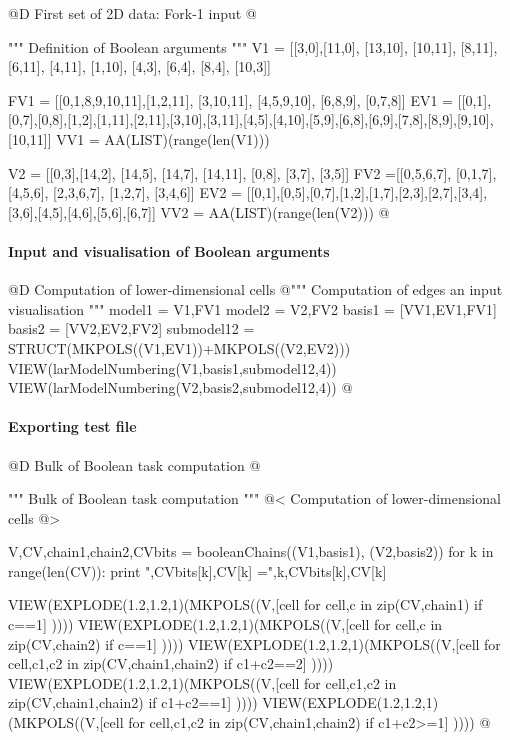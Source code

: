 \documentclass[11pt,oneside]{article}	%
\begin{document}
@D First set of 2D data: Fork-1 input
@{""" Definition of Boolean arguments """
V1 = [[3,0],[11,0], [13,10], [10,11], [8,11], [6,11], [4,11], [1,10], [4,3], [6,4], 
	[8,4], [10,3]]
	
FV1 = [[0,1,8,9,10,11],[1,2,11], [3,10,11], [4,5,9,10], [6,8,9], [0,7,8]]
EV1 = [[0,1],[0,7],[0,8],[1,2],[1,11],[2,11],[3,10],[3,11],[4,5],[4,10],[5,9],[6,8],[6,9],[7,8],[8,9],[9,10],[10,11]]
VV1 = AA(LIST)(range(len(V1)))

V2 = [[0,3],[14,2], [14,5], [14,7], [14,11], [0,8], [3,7], [3,5]]
FV2 =[[0,5,6,7], [0,1,7], [4,5,6], [2,3,6,7], [1,2,7], [3,4,6]]
EV2 = [[0,1],[0,5],[0,7],[1,2],[1,7],[2,3],[2,7],[3,4],[3,6],[4,5],[4,6],[5,6],[6,7]]
VV2 = AA(LIST)(range(len(V2)))
@}


\paragraph{Input and visualisation of Boolean arguments}

@D Computation of lower-dimensional cells
@{""" Computation of edges an input visualisation """
model1 = V1,FV1
model2 = V2,FV2
basis1 = [VV1,EV1,FV1]
basis2 = [VV2,EV2,FV2]
submodel12 = STRUCT(MKPOLS((V1,EV1))+MKPOLS((V2,EV2)))
VIEW(larModelNumbering(V1,basis1,submodel12,4))
VIEW(larModelNumbering(V2,basis2,submodel12,4))
@}

\paragraph{Exporting test file}

@D Bulk of Boolean task computation
@{""" Bulk of Boolean task computation """
@< Computation of lower-dimensional cells @>

V,CV,chain1,chain2,CVbits = booleanChains((V1,basis1), (V2,basis2))
for k in range(len(CV)):  print "\nk,CVbits[k],CV[k] =",k,CVbits[k],CV[k]

VIEW(EXPLODE(1.2,1.2,1)(MKPOLS((V,[cell for cell,c in zip(CV,chain1) if c==1] ))))
VIEW(EXPLODE(1.2,1.2,1)(MKPOLS((V,[cell for cell,c in zip(CV,chain2) if c==1] ))))
VIEW(EXPLODE(1.2,1.2,1)(MKPOLS((V,[cell for cell,c1,c2 in zip(CV,chain1,chain2) if c1+c2==2] ))))
VIEW(EXPLODE(1.2,1.2,1)(MKPOLS((V,[cell for cell,c1,c2 in zip(CV,chain1,chain2) if c1+c2==1] ))))
VIEW(EXPLODE(1.2,1.2,1)(MKPOLS((V,[cell for cell,c1,c2 in zip(CV,chain1,chain2) if c1+c2>=1] ))))
@}
\end{document}
